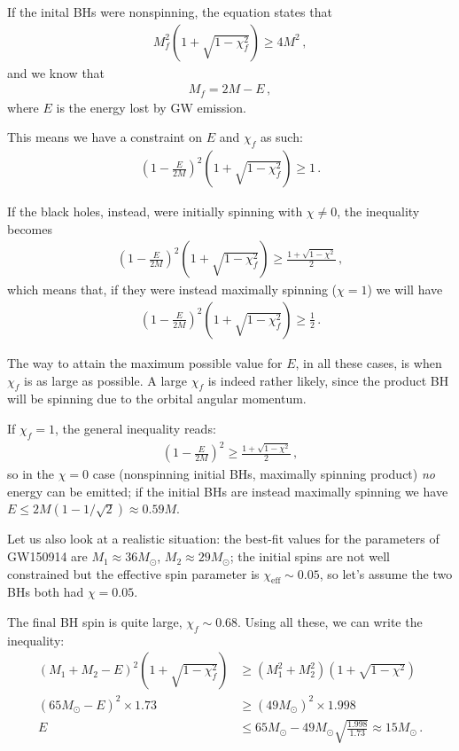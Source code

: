 \documentclass[main.tex]{subfiles}
\begin{document}
If the inital BHs were nonspinning, the equation states that %
\begin{align}
M_f^2 \left(1 + \sqrt{1 - \chi _f^2}\right) \geq 4 M^2
\,,
\end{align}
%
and we know that %
\begin{align}
M_f = 2M - E
\,,
\end{align}
%
where \(E\) is the energy lost by GW emission. 

This means we have a constraint on \(E\) and \(\chi _f\) as such: %
\begin{align}
\left(1 - \frac{E}{2M}\right)^2 \left(1 + \sqrt{1 - \chi _f^2}\right) \geq 1
\,.
\end{align}

If the black holes, instead, were initially spinning with \(\chi \neq 0\), the inequality becomes %
\begin{align}
\left(1 - \frac{E}{2M}\right)^2 \left(1 + \sqrt{1 - \chi _f^2}\right) \geq \frac{1 + \sqrt{1 - \chi^2}}{2}
\,,
\end{align}
%
which means that, if they were instead maximally spinning (\(\chi = 1\)) we will have 
%
\begin{align}
\left(1 - \frac{E}{2M}\right)^2 \left(1 + \sqrt{1 - \chi _f^2}\right) \geq \frac{1}{2}
\,.
\end{align}

The way to attain the maximum possible value for \(E\), in all these cases, is when \(\chi _f\) is as large as possible. 
A large \(\chi _f\) is indeed rather likely, since the product BH will be spinning due to the orbital angular momentum. 

If \(\chi _f = 1\), the general inequality reads: 
%
\begin{align}
\left(1 - \frac{E}{2M}\right)^2 \geq \frac{1 + \sqrt{1 - \chi^2}}{2} 
\,,
\end{align}
%
so in the \(\chi = 0\) case (nonspinning initial BHs, maximally spinning product) \emph{no} energy can be emitted; if the initial BHs are instead maximally spinning we have \(E \leq 2M ( 1 - 1/\sqrt{2}) \approx 0.59 M\).

Let us also look at a realistic situation: the best-fit values for the parameters of GW150914 are \(M_1 \approx 36M_{\odot}\), \(M_2 \approx 29M_{\odot}\); the initial spins are not well constrained but the effective spin parameter is \(\chi _{\text{eff}} \sim 0.05\), so let's assume the two BHs both had \(\chi = 0.05\). 

The final BH spin is quite large, \(\chi _f \sim 0.68\). 
Using all these, we can write the inequality: %
\begin{align}
(M_1 + M_2 - E)^2 \left(1 + \sqrt{1 - \chi_f^2}\right) &\geq (M_1^2 + M_2^2 ) \left(1 + \sqrt{1 - \chi^2}\right)  \\
(65 M_{\odot} - E)^2 \times 1.73 &\geq (49 M_{\odot})^2 \times 1.998  \\
E &\leq 65M_{\odot} - 49 M_{\odot} \sqrt{\frac{1.998}{1.73}} \approx 15 M_{\odot}
\,.
\end{align}
\end{document}
